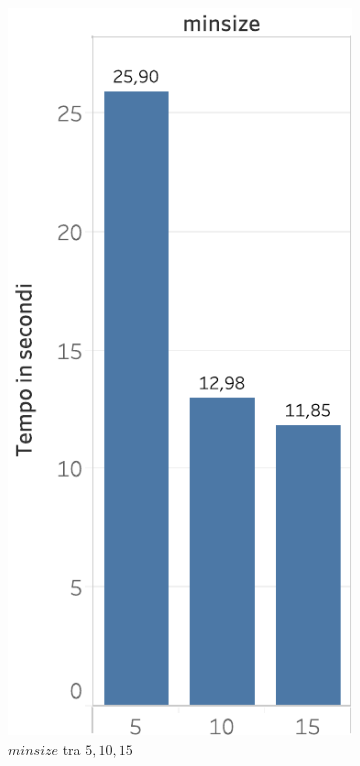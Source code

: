 \begin{figure}
  \centering
   \begin{subfigure}{.5\textwidth}
  \centering
    \includegraphics[scale=0.5]{res/fig/sec-4/performance/TimeMinsize.pdf}
   \caption{\(minsize\) tra \(5,10,15\)}
  \label{fig:chap-4:TimeMinsize}
\end{subfigure}%
\begin{subfigure}{.5\textwidth}
  \centering

\end{subfigure}
\end{figure}
